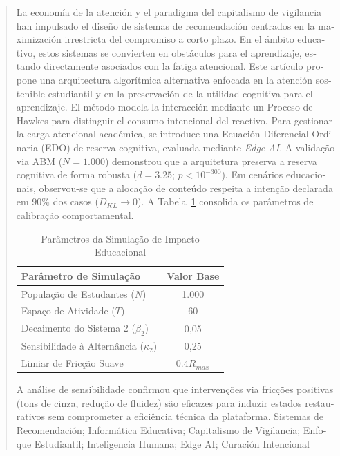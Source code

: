 \documentclass[english, spanish, brazilian]{RBIEarticle}
\begin{document}
\begin{otherlanguage}{spanish}
\begin{abstract}
La economía de la atención y el paradigma del capitalismo de vigilancia han impulsado el diseño de sistemas de recomendación centrados en la maximización irrestricta del compromiso a corto plazo. En el ámbito educativo, estos sistemas se convierten en obstáculos para el aprendizaje, estando directamente asociados con la fatiga atencional. Este artículo propone una arquitectura algorítmica alternativa enfocada en la atención sostenible estudiantil y en la preservación de la utilidad cognitiva para el aprendizaje. El método modela la interacción mediante un Proceso de Hawkes para distinguir el consumo intencional del reactivo. Para gestionar la carga atencional académica, se introduce una Ecuación Diferencial Ordinaria (EDO) de reserva cognitiva, evaluada mediante \textit{Edge AI}. A validação via ABM ($N=1.000$) demonstrou que a arquitetura preserva a reserva cognitiva de forma robusta ($d = 3.25$; $p < 10^{-300}$). Em cenários educacionais, observou-se que a alocação de conteúdo respeita a intenção declarada em $90\%$ dos casos ($D_{KL} \to 0$). A Tabela~\ref{tab:abm_rbie} consolida os parâmetros de calibração comportamental.

\begin{table}[h]
\centering
\caption{Parâmetros da Simulação de Impacto Educacional}
\label{tab:abm_rbie}
\begin{tabular}{lc} \hline
\textbf{Parâmetro de Simulação} & \textbf{Valor Base} \\ \hline
População de Estudantes ($N$) & 1.000 \\
Espaço de Atividade ($T$)       & 60 \\
Decaimento do Sistema 2 ($\beta_2$) & 0,05 \\
Sensibilidade à Alternância ($\kappa_2$) & 0,25 \\
Limiar de Fricção Suave & $0.4 R_{max}$ \\ \hline
\end{tabular}
\end{table}

A análise de sensibilidade confirmou que intervenções via fricções positivas (tons de cinza, redução de fluidez) são eficazes para induzir estados restaurativos sem comprometer a eficiência técnica da plataforma.
\keywords Sistemas de Recomendación; Informática Educativa; Capitalismo de Vigilancia; Enfoque Estudiantil; Inteligencia Humana; Edge AI; Curación Intencional
\end{abstract}
\end{otherlanguage}
\end{document}
